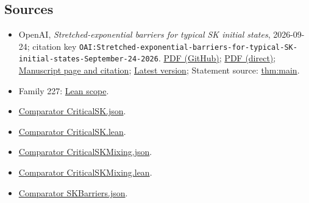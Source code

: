 \documentclass[11pt]{article}
\begin{document}
\subsection{Sources}
\begin{itemize}
\item OpenAI, \emph{Stretched-exponential barriers for typical SK initial states}, 2026-09-24; citation key \texttt{OAI:Stretched-exponential-barriers-for-typical-SK-initial-states-September-24-2026}. \href{https://github.com/openai/math/blob/adc7f1241b42e322a6451854ab7e4b4c146bf78a/preprints/Stretched-exponential-barriers-for-typical-SK-initial-states-September-24-2026/paper.pdf}{PDF (GitHub)}; \href{https://github.com/openai/math/raw/adc7f1241b42e322a6451854ab7e4b4c146bf78a/preprints/Stretched-exponential-barriers-for-typical-SK-initial-states-September-24-2026/paper.pdf}{PDF (direct)}; \href{https://github.com/openai/math/blob/adc7f1241b42e322a6451854ab7e4b4c146bf78a/preprints/Stretched-exponential-barriers-for-typical-SK-initial-states-September-24-2026/README.md}{Manuscript page and citation}; \href{https://github.com/openai/math/blob/main/preprints/Stretched-exponential-barriers-for-typical-SK-initial-states-September-24-2026/paper.pdf}{Latest version}; Statement source: \href{https://github.com/openai/math/blob/adc7f1241b42e322a6451854ab7e4b4c146bf78a/preprints/Stretched-exponential-barriers-for-typical-SK-initial-states-September-24-2026/build/sections/01-introduction.tex\#L62}{thm:main}.
\item Family 227: \href{https://github.com/openai/math/blob/adc7f1241b42e322a6451854ab7e4b4c146bf78a/lean/docs/227.md}{Lean scope}.
\item \href{https://github.com/openai/math/blob/adc7f1241b42e322a6451854ab7e4b4c146bf78a/lean/ComparatorChallenges/CriticalSK.json}{Comparator CriticalSK.json}.
\item \href{https://github.com/openai/math/blob/adc7f1241b42e322a6451854ab7e4b4c146bf78a/lean/ComparatorChallenges/CriticalSK.lean}{Comparator CriticalSK.lean}.
\item \href{https://github.com/openai/math/blob/adc7f1241b42e322a6451854ab7e4b4c146bf78a/lean/ComparatorChallenges/CriticalSKMixing.json}{Comparator CriticalSKMixing.json}.
\item \href{https://github.com/openai/math/blob/adc7f1241b42e322a6451854ab7e4b4c146bf78a/lean/ComparatorChallenges/CriticalSKMixing.lean}{Comparator CriticalSKMixing.lean}.
\item \href{https://github.com/openai/math/blob/adc7f1241b42e322a6451854ab7e4b4c146bf78a/lean/ComparatorChallenges/SKBarriers.json}{Comparator SKBarriers.json}.

\end{itemize}
\end{document}
